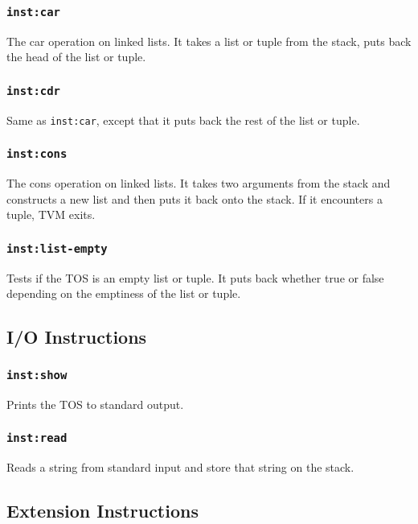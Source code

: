 \documentclass{article}
\newcommand{\inst}[1] {\texttt{inst:#1}}
\begin{document}
\subsubsection{\inst{car}}

The car operation on linked lists. It takes a list or tuple from the stack, puts back the head of the list or tuple.

\subsubsection{\inst{cdr}}

Same as \inst{car}, except that it puts back the rest of the list or tuple.

\subsubsection{\inst{cons}}

The cons operation on linked lists. It takes two arguments from the stack and constructs a new list and then puts it back onto the stack. If it encounters a tuple, TVM exits.

\subsubsection{\inst{list-empty}}

Tests if the TOS is an empty list or tuple. It puts back whether true or false depending on the emptiness of the list or tuple.

\subsection{I/O Instructions}

\subsubsection{\inst{show}}

Prints the TOS to standard output.

\subsubsection{\inst{read}}

Reads a string from standard input and store that string on the stack.

\subsection{Extension Instructions}
\end{document}
